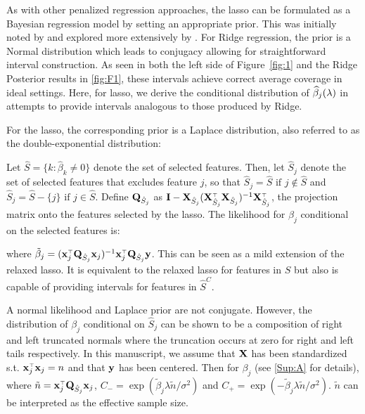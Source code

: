 As with other penalized regression approaches, the lasso can be formulated as a Bayesian regression model by setting an appropriate prior. This was initially noted by \cite{Tibshirani1996} and explored more extensively by \cite{Park2008}.  For Ridge regression, the prior is a Normal distribution which leads to conjugacy allowing for straightforward interval construction. As seen in both the left side of Figure~\ref{fig:1} and the Ridge Posterior results in \ref{fig:F1}, these intervals achieve correct average coverage in ideal settings. Here, for lasso, we derive the conditional distribution of $\widehat{\beta}_j(\lambda)$ in attempts to provide intervals analogous to those produced by Ridge.

For the lasso, the corresponding prior is a Laplace distribution, also referred to as the double-exponential distribution:

Let $\hat{S} = \lbrace k: \hat{\beta}_k \neq  0 \rbrace$ denote the set of selected features. Then, let $\hat{S}_j$ denote the set of selected features that excludes feature $j$, so that $\hat{S}_j = \hat{S} \text{ if } j \notin \hat{S}$ and $\hat{S}_j = \hat{S} - \lbrace j \rbrace \text{ if } j \in \hat{S}$. Define $\mathbf{Q}_{\hat{S}_j}$ as $\mathbf{I} - \mathbf{X}_{\hat{S}_j}(\mathbf{X}_{\hat{S}_j} ^{\scriptscriptstyle\top} \mathbf{X}_{\hat{S}_j})^{-1} \mathbf{X}_{\hat{S}_j} ^{\scriptscriptstyle\top}$, the projection matrix onto the features selected by the lasso. The likelihood for $\beta_j$ conditional on the selected features is:

\noindent where $\tilde{\beta}_j = (\mathbf{x}_j ^{\scriptscriptstyle\top} \mathbf{Q}_{\hat{S}_j} \mathbf{x}_j)^{-1} \mathbf{x}_j ^{\scriptscriptstyle\top} \mathbf{Q}_{\hat{S}_j} \mathbf{y}$.  This can be seen as a mild extension of the relaxed lasso. It is equivalent to the relaxed lasso for features in $\hat{S}$ but also is capable of providing intervals for features in $\hat{S}^C$.

A normal likelihood and Laplace prior are not conjugate. However, the distribution of $\beta_j$ conditional on $\hat{S}_j $ can be shown to be a composition of right and left truncated normals where the truncation occurs at zero for right and left tails respectively. In this manuscript, we assume that $\mathbf{X}$ has been standardized s.t. $\mathbf{x}_j ^{\scriptscriptstyle\top}\mathbf{x}_j = n$ and that $\mathbf{y}$ has been centered. Then for $\beta_j$ (see \ref{Sup:A} for details),
where $\tilde{n} = \mathbf{x}_j ^{\scriptscriptstyle\top} \mathbf{Q}_{\hat{S}_j} \mathbf{x}_j$, $C_{-} = \exp(\tilde{\beta}_j \lambda \tilde{n}/\sigma^2)$ and $C_{+} = \exp(-\tilde{\beta}_j \lambda \tilde{n}/\sigma^2)$. $\tilde{n}$ can be interpreted as the effective sample size.

